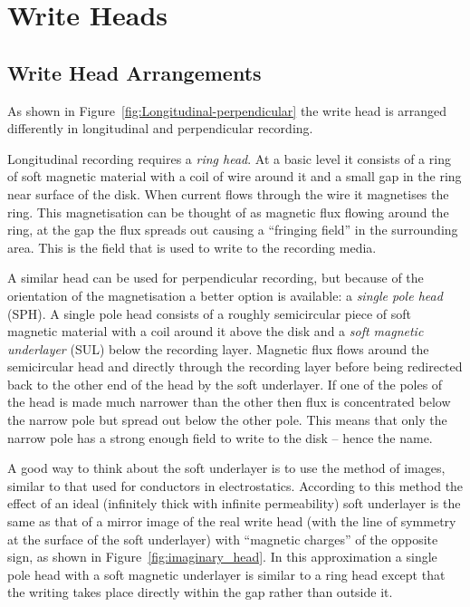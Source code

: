 \section{Write Heads}

\subsection{Write Head Arrangements}

As shown in Figure~\ref{fig:Longitudinal-perpendicular} the write head is
arranged differently in longitudinal and perpendicular recording.

Longitudinal recording requires a \emph{ring head}. At a basic level it consists
of a ring of soft magnetic material with a coil of wire around it and a small
gap in the ring near surface of the disk. When current flows through the wire it
magnetises the ring. This magnetisation can be thought of as magnetic flux
flowing around the ring, at the gap the flux spreads out causing a ``fringing
field'' in the surrounding area. This is the field that is used to write to the
recording media.\cite{Khizroev2004a}

A similar head can be used for perpendicular recording, but because of the
orientation of the magnetisation a better option is available: a \emph{single
  pole head }(SPH). A single pole head consists of a roughly semicircular piece
of soft magnetic material with a coil around it above the disk and a \emph{soft
  magnetic underlayer} (SUL) below the recording layer.  Magnetic flux flows
around the semicircular head and directly through the recording layer before
being redirected back to the other end of the head by the soft underlayer. If
one of the poles of the head is made much narrower than the other then flux is
concentrated below the narrow pole but spread out below the other pole. This
means that only the narrow pole has a strong enough field to write to the disk
-- hence the name.\cite{Khizroev2004a}

A good way to think about the soft underlayer is to use the method of images,
similar to that used for conductors in electrostatics. \cite{Hoinville2002}
According to this method the effect of an ideal (infinitely thick with infinite
permeability) soft underlayer is the same as that of a mirror image of the real
write head (with the line of symmetry at the surface of the soft underlayer)
with ``magnetic charges'' of the opposite sign, as shown in
Figure~\ref{fig:imaginary_head}. In this approximation a single pole head with a
soft magnetic underlayer is similar to a ring head except that the writing takes
place directly within the gap rather than outside it.\cite{Richter2007a}

